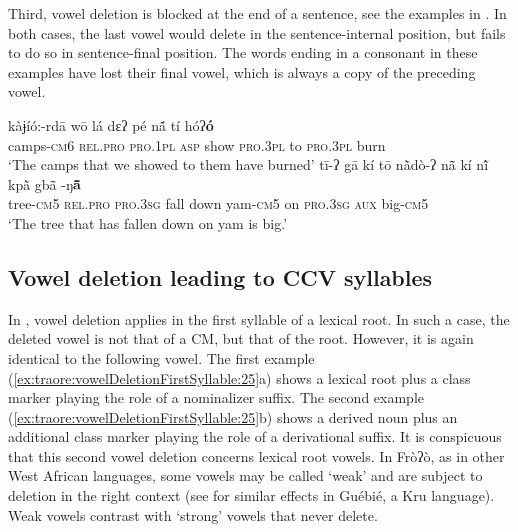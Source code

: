 \documentclass[output=paper]{langscibook}
\begin{document}
Third, vowel deletion is blocked at the end of a sentence, see the examples in . In both cases, the last vowel would delete in the sentence-internal position, but fails to do so in sentence-final position. The words ending in a consonant in these examples have lost their final vowel, which is always a copy of the preceding vowel.

\begin{exe}
    \ex \label{ex:traore:vowelDeletionBlockedAtEndOfSentence:24}
    \begin{xlist}
   \ex \gll kàɉíó:-rdā  wō  lá  dɛʔ pé  nã́  tí  hóʔ\textbf{ó}\\ 
            camps-\textsc{cm}6     \textsc{rel.pro}    \textsc{pro.1pl}    \textsc{asp} show    \textsc{pro.3pl}     to    \textsc{pro.3pl}     burn\\
         \glt    ‘The camps that we showed to them have burned’ 
    \ex \gll tī-ʔ   gā  kí  tō  nã̀dò-ʔ  nã̄  kí  nĩ́  kpã̀  gbã̄ -ŋ\textbf{ã̄ }\\
              tree-\textsc{cm}5 \textsc{rel.pro}    \textsc{pro.3sg}    {fall down}  yam-\textsc{cm}5  on    \textsc{pro.3sg}   \textsc{aux}    big-\textsc{cm}5\\
              \glt `The tree that has fallen down on yam is big.'
\end{xlist}
\end{exe}

\subsection{ Vowel deletion leading to CCV syllables}
\label{sec:traore:vowel_deletion_ccv:3b}

In , vowel deletion applies in the first syllable of a lexical root. In such a case, the deleted vowel is not that of a CM, but that of the root. However, it is again identical to the following vowel. The first example (\ref{ex:traore:vowelDeletionFirstSyllable:25}a) shows a lexical root plus a class marker playing the role of a nominalizer suffix. The second example (\ref{ex:traore:vowelDeletionFirstSyllable:25}b) shows a derived noun plus an additional class marker playing the role of a derivational suffix. It is conspicuous that this second vowel deletion concerns lexical root vowels. In Fròʔò, as in other West African languages, some vowels may be called ‘weak’ and are subject to deletion in the right context (see \citealt{Sande2017} for similar effects in Guébié, a Kru language). Weak vowels contrast with ‘strong’ vowels that never delete.\pagebreak
\end{document}
